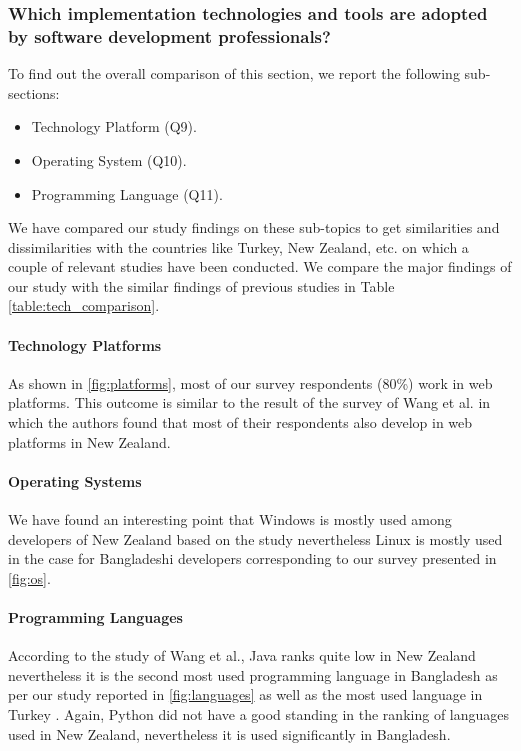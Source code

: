 \subsubsection{Which implementation technologies and tools are adopted by software development professionals?}

To find out the overall comparison of this section, we report the following sub-sections:
\begin{itemize}
\item Technology Platform (Q9).
\item Operating System (Q10).
\item Programming Language (Q11).
\end{itemize}

We have compared our study findings on these sub-topics to get similarities and dissimilarities with the countries like Turkey, New Zealand, etc. on which a couple of relevant studies have been conducted. We compare the major findings of our study with the similar findings of previous studies in Table \ref{table:tech_comparison}.



\paragraph{Technology Platforms}
As shown in \ref{fig:platforms}, most of our survey respondents (80\%) work in web platforms. This outcome is similar to the result of the survey of Wang et al. \cite{Wang2018} in which the authors found that most of their respondents also develop in web platforms in New Zealand.


\paragraph{Operating Systems}
We have found an interesting point that Windows is mostly used among developers of New Zealand based on the study \cite{Wang2018} nevertheless Linux is mostly used in the case for Bangladeshi developers corresponding to our survey presented in \ref{fig:os}.


\paragraph{Programming Languages}
According to the study of Wang et al.\cite{Wang2018}, Java ranks quite low in New Zealand nevertheless it is the second most used programming language in Bangladesh as per our study reported in \ref{fig:languages} as well as the most used language in Turkey \cite{Garousi2015}. Again, Python did not have a good standing in the ranking of languages used in New Zealand, nevertheless it is used significantly in Bangladesh.
